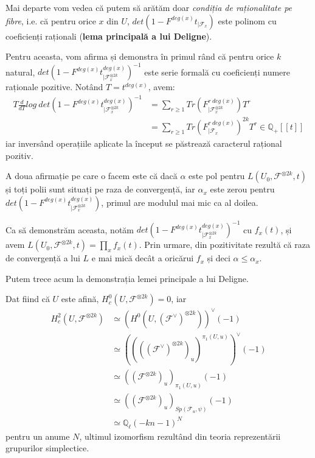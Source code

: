 \documentclass[13pt,openany]{book}
\begin{document}
Mai departe vom vedea că putem să arătăm doar {\it condiția de raționalitate pe fibre}, i.e. că pentru orice $x$ din $U$, $det(1-F^{deg(x)}t_{\mid\mathcal{F}_x})$ este polinom cu coeficienți raționali ({\bf lema principală a lui Deligne}).

Pentru aceasta, vom afirma și demonstra în primul rând că pentru orice $k$ natural, $det(1-F^{deg(x)}t^{deg(x)}_{\mid\mathcal{F}^{\otimes 2k}_x})^{-1}$ este serie formală cu coeficienți numere raționale pozitive. Notând $T=t^{deg(x)}$, avem:
\begin{align*}
T\frac{d}{dT}log\ det(1-F^{deg(x)}t^{deg(x)}_{\mid\mathcal{F}^{\otimes 2k}_x})^{-1}&=\sum\limits_{r\geq 1} Tr(F^{r\ deg(x)}_{\mid\mathcal{F}^{\otimes 2k}_x})T^r\\
&= \sum\limits_{r\geq 1} Tr(F^{r\ deg(x)}_{\mid\mathcal{F}_x})^{2k} T^r \in \mathbb{Q}_+[[t]]
\end{align*}
iar inversând operațiile aplicate la început se păstrează caracterul rațional pozitiv.

A doua afirmație pe care o facem este că dacă $\alpha$ este pol pentru $L(U_0,\mathcal{F}^{\otimes 2k},t)$ și toți polii sunt situați pe raza de convergență, iar $\alpha_x$ este zerou pentru $det(1-F^{deg(x)}t^{deg(x)}_{\mid\mathcal{F}^{\otimes 2k}_x})$, primul are modulul mai mic ca al doilea.

Ca să demonstrăm aceasta, notăm $det(1-F^{deg(x)}t^{deg(x)}_{\mid\mathcal{F}^{\otimes 2k}_x})^{-1}$ cu $f_x(t)$, și avem $L(U_0,\mathcal{F}^{\otimes 2k},t)=\prod_x f_x(t)$. Prin urmare, din pozitivitate rezultă că raza de convergență a lui $L$ e mai mică decât a oricărui $f_x$ și deci $\alpha\leq\alpha_x$.

Putem trece acum la demonstrația lemei principale a lui Deligne.

Dat fiind că $U$ este afină, $H^0_c(U,\mathcal{F}^{\otimes 2k})=0$, iar
\begin{align*}
H^2_c(U,\mathcal{F}^{\otimes 2k}) &\simeq (H^0(U,(\mathcal{F}^{\vee})^{\otimes 2k}))^{\vee}(-1)\\
&\simeq ((((\mathcal{F}^\vee)^{\otimes 2k})_u)^{\pi_1(U,u)})^{\vee}(-1)\\
&\simeq ((\mathcal{F}^{\otimes 2k})_u)_{\pi_1(U,u)}(-1)\\
&\simeq ((\mathcal{F}^{\otimes 2k})_u)_{Sp(\mathcal{F}_u,\psi)}(-1)\\
&\simeq \mathbb{Q}_\ell(-kn-1)^N
\end{align*}
pentru un anume $N$, ultimul izomorfism rezultând din teoria reprezentării grupurilor simplectice.
\end{document}
